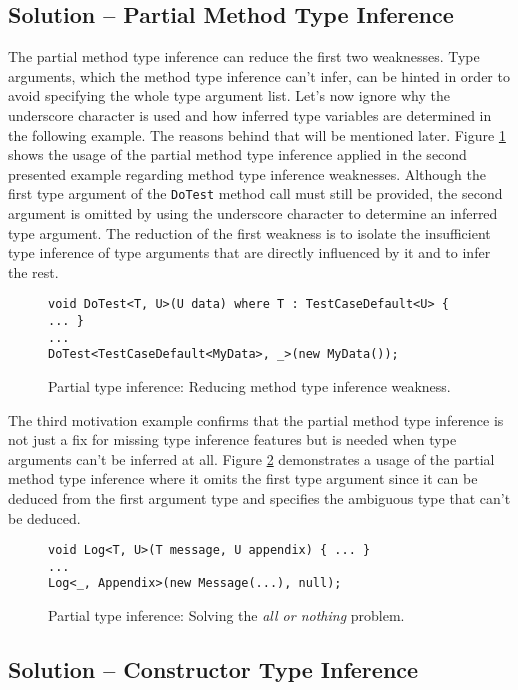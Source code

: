 \subsection{Solution -- Partial Method Type Inference}

The partial method type inference can reduce the first two weaknesses. 
Type arguments, which the method type inference can’t infer, can be hinted in order to avoid specifying the whole type argument list. 
Let’s now ignore why the underscore character is used and how inferred type variables are determined in the following example. 
The reasons behind that will be mentioned later.
Figure \ref{img32:sol1} shows the usage of the partial method type inference applied in the second presented example regarding method type inference weaknesses. 
Although the first type argument of the \texttt{DoTest} method call must still be provided, the second argument is omitted by using the underscore character to determine an inferred type argument. 
The reduction of the first weakness is to isolate the insufficient type inference of type arguments that are directly influenced by it and to infer the rest.
\begin{figure}[h]
\begin{lstlisting}[style=csharp]
void DoTest<T, U>(U data) where T : TestCaseDefault<U> { ... }
...
DoTest<TestCaseDefault<MyData>, _>(new MyData());
\end{lstlisting}
\caption{Partial type inference: Reducing method type inference weakness.}
\label{img32:sol1}
\end{figure}
\par
The third motivation example confirms that the partial method type inference is not just a fix for missing type inference features but is needed when type arguments can’t be inferred at all. 
Figure \ref{img33:sol2} demonstrates a usage of the partial method type inference where it omits the first type argument since it can be deduced from the first argument type and specifies the ambiguous type that can’t be deduced.
\begin{figure}[h]
\begin{lstlisting}[style=csharp]
void Log<T, U>(T message, U appendix) { ... }
...
Log<_, Appendix>(new Message(...), null);
\end{lstlisting}
\caption{Partial type inference: Solving the \textit{all or nothing} problem.}
\label{img33:sol2}
\end{figure}

\newpage

\subsection{Solution -- Constructor Type Inference}

